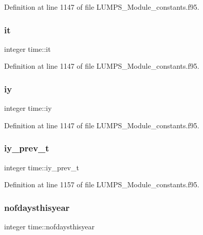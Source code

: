 Definition at line 1147 of file L\+U\+M\+P\+S\+\_\+\+Module\+\_\+constants.\+f95.

\mbox{\label{namespacetime_a88a6c141593462330d65da0397b9b71d}} 
\subsubsection{\texorpdfstring{it}{it}}
{\footnotesize\ttfamily integer time\+::it}



Definition at line 1147 of file L\+U\+M\+P\+S\+\_\+\+Module\+\_\+constants.\+f95.

\mbox{\label{namespacetime_a7dd4adda8e1403aee1caa796036c7204}} 
\subsubsection{\texorpdfstring{iy}{iy}}
{\footnotesize\ttfamily integer time\+::iy}



Definition at line 1147 of file L\+U\+M\+P\+S\+\_\+\+Module\+\_\+constants.\+f95.

\mbox{\label{namespacetime_a6c4033d0e3f01ba6ea142f00749d0e4e}} 
\subsubsection{\texorpdfstring{iy\+\_\+prev\+\_\+t}{iy\_prev\_t}}
{\footnotesize\ttfamily integer time\+::iy\+\_\+prev\+\_\+t}



Definition at line 1157 of file L\+U\+M\+P\+S\+\_\+\+Module\+\_\+constants.\+f95.

\mbox{\label{namespacetime_a2fa97bd4906ad27fe47d4699afc88fe2}} 
\subsubsection{\texorpdfstring{nofdaysthisyear}{nofdaysthisyear}}
{\footnotesize\ttfamily integer time\+::nofdaysthisyear}



